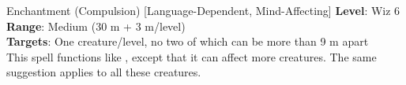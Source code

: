 {Enchantment (Compulsion) [Language-Dependent, Mind-Affecting]}
{
	\textbf{Level}: Wiz 6\\
	\textbf{Range}: Medium (30 m + 3 m/level)\\
	\textbf{Targets}: One creature/level, no two of which can be more than 9 m apart\\
}
{
	This spell functions like , except that it can affect more creatures. The same suggestion applies to all these creatures.
}